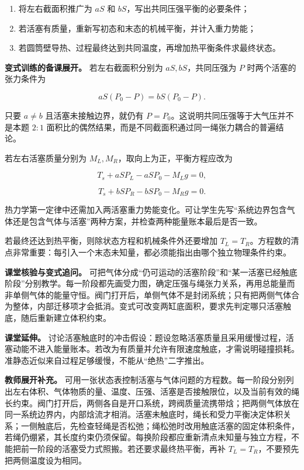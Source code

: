 \documentclass[12pt,a4paper,UTF8]{ctexart}
\newcommand{\tightlist}{\setlength{\itemsep}{0pt}\setlength{\parskip}{0pt}}
\begin{document}
\begin{enumerate}
\def\labelenumi{\arabic{enumi}.}
\tightlist
\item
  将左右截面积推广为 \(aS\) 和 \(bS\)，写出共同压强平衡的必要条件；
\item
  若活塞有质量，重新写初态和末态的机械平衡，并计入重力势能；
\item
  若圆筒壁导热、过程最终达到共同温度，再增加热平衡条件求最终状态。
\end{enumerate}

\textbf{变式训练的备课展开。} 若左右截面积分别为 \(aS,bS\)，共同压强为
\(P\) 时两个活塞的张力条件为

\[
aS(P_0-P)=bS(P_0-P).
\]

只要 \(a\neq b\) 且活塞未接触边界，就仍有
\(P=P_0\)。这说明共同压强等于大气压并不是本题 \(2:1\)
面积比的偶然结果，而是不同截面积通过同一绳张力耦合的普遍结论。

若左右活塞质量分别为 \(M_L,M_R\)，取向上为正，平衡方程应改为

\[
T_s+aSP_L-aSP_0-M_Lg=0,
\]

\[
T_s+bSP_R-bSP_0-M_Rg=0.
\]

热力学第一定律中还需加入两活塞重力势能变化。可让学生先写``系统边界包含气体还是包含气体与活塞''两种方案，并检查两种能量账本最后是否一致。

若最终还达到热平衡，则除状态方程和机械条件外还要增加
\(T_L=T_R\)。方程数的清点非常重要：每引入一个末态未知量，都必须能指出由哪个独立物理条件约束。

\textbf{课堂核验与变式追问。}
可把气体分成``仍可运动的活塞阶段''和``某一活塞已经触底阶段''分别教学。每一阶段都先画受力图，确定压强与绳张力关系，再用总能量而非单侧气体的能量守恒。阀门打开后，单侧气体不是封闭系统；只有把两侧气体合为整体，内部迁移项才会抵消。变式可改变两缸底面积，要求先判定哪只活塞触底，随后重新建立体积约束。

\textbf{课堂延伸。}
讨论活塞触底时的冲击假设：题设忽略活塞质量且采用缓慢过程，活塞动能不进入能量账本。若改为有质量并允许有限速度触底，才需说明碰撞损耗。准静态近似来自过程足够缓慢，不能从``绝热''二字推出。

\textbf{教师展开补充。}
可用一张状态表控制活塞与气体问题的方程数。每一阶段分别列出左右体积、气体物质的量、温度、压强、活塞是否接触限位，以及当前有效的绳长约束。阀门打开后，两侧各自是开口系统，跨阀质量流携带焓；把两侧气体放在同一系统边界内，内部焓流才相消。活塞未触底时，绳长和受力平衡决定体积关系；一侧触底后，先检查轻绳是否松弛；绳松弛时改用触底活塞的固定体积条件，若绳仍绷紧，其长度约束仍须保留。每换阶段都应重新清点未知量与独立方程，不能把前一阶段的活塞受力式照搬。若还要求最终热平衡，再补
\(T_L=T_R\)，不要预先把两侧温度设为相同。
\end{document}
